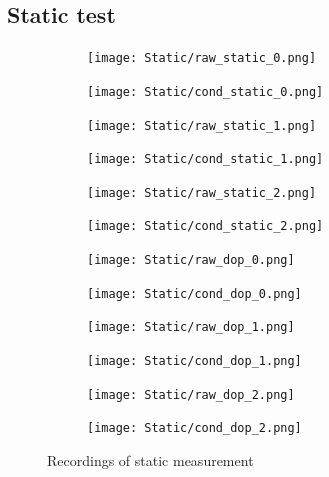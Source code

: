 \documentclass{article}
\begin{document}
		\subsection{Static test}
			\begin{figure}[h]
		   		\centering
		     	\begin{subfigure}[b]{0.45\textwidth}
		      		\centering
		      	  	\texttt{[image: Static/raw\_static\_0.png]}
		     	\end{subfigure}
		     	\begin{subfigure}[b]{0.45\textwidth}
		      	   \centering
		      	   \texttt{[image: Static/cond\_static\_0.png]}
		     	\end{subfigure}
		     	\begin{subfigure}[b]{0.45\textwidth}
		      		\centering
		      	  	\texttt{[image: Static/raw\_static\_1.png]}
		     	\end{subfigure}
		     	\begin{subfigure}[b]{0.45\textwidth}
		      	   \centering
		      	   \texttt{[image: Static/cond\_static\_1.png]}
		     	\end{subfigure}
		     	\begin{subfigure}[b]{0.45\textwidth}
		      		\centering
		      	  	\texttt{[image: Static/raw\_static\_2.png]}
		     	\end{subfigure}
		     	\begin{subfigure}[b]{0.45\textwidth}
		      	   \centering
		      	   \texttt{[image: Static/cond\_static\_2.png]}
		     	\end{subfigure}
		     	\begin{subfigure}[b]{0.45\textwidth}
		      		\centering
		      	  	\texttt{[image: Static/raw\_dop\_0.png]}
		     	\end{subfigure}
		     	\begin{subfigure}[b]{0.45\textwidth}
		      	   \centering
		      	   \texttt{[image: Static/cond\_dop\_0.png]}
		     	\end{subfigure}
		     	\begin{subfigure}[b]{0.45\textwidth}
		      		\centering
		      	  	\texttt{[image: Static/raw\_dop\_1.png]}
		     	\end{subfigure}
		     	\begin{subfigure}[b]{0.45\textwidth}
		      	   \centering
		      	   \texttt{[image: Static/cond\_dop\_1.png]}
		     	\end{subfigure}
		     	\begin{subfigure}[b]{0.45\textwidth}
		      		\centering
		      	  	\texttt{[image: Static/raw\_dop\_2.png]}
		     	\end{subfigure}
		     	\begin{subfigure}[b]{0.45\textwidth}
		      	   \centering
		      	   \texttt{[image: Static/cond\_dop\_2.png]}
		     	\end{subfigure}
		      \caption{Recordings of static measurement}
		      \label{fig:static_plots}
			\end{figure}		
\end{document}
